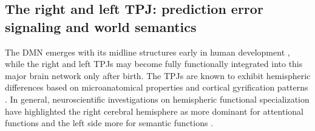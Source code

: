 \documentclass[10pt,letterpaper]{article}
\begin{document}
\subsection{The right and left TPJ: prediction error signaling and world semantics}
The DMN emerges with its midline structures early in human development
\citep{doria2010}, while
the right and left TPJs may become fully functionally integrated into this major brain
network only after birth.
The TPJs are known to exhibit hemispheric differences
based on microanatomical properties and cortical gyrification patterns
\citep{seghier2013angular}.
In general, neuroscientific investigations on hemispheric functional specialization
have highlighted the right cerebral hemisphere as more dominant for attentional functions
and the left side more for semantic functions
\citep{seghier2013angular, bzdok2013tpj, bzdok2016left,
stephan2007mechanisms}.
\end{document}
